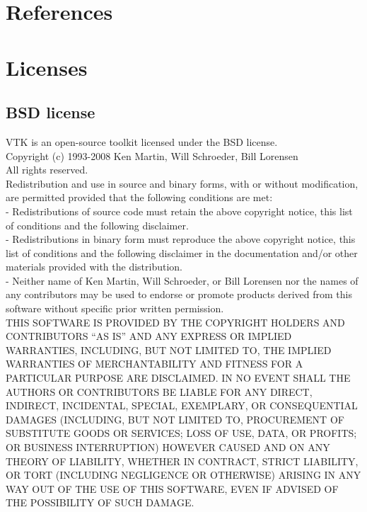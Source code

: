 \documentclass[a4paper,12pt,openany]{book}
\theoremstyle{break}
\begin{document}
\section{References}

\section{Licenses}
\subsection{BSD license}
VTK is an open-source toolkit licensed under the BSD license.\\
Copyright (c) 1993-2008 Ken Martin, Will Schroeder, Bill Lorensen \\
All rights reserved.\\
Redistribution and use in source and binary forms, with or without modification, are permitted provided that the following conditions are met: \\
- Redistributions of source code must retain the above copyright notice, this list of conditions and the following disclaimer. \\
- Redistributions in binary form must reproduce the above copyright notice, this list of conditions and the following disclaimer in the documentation and/or other materials provided with the distribution. \\
- Neither name of Ken Martin, Will Schroeder, or Bill Lorensen nor the names of any contributors may be used to endorse or promote products derived from this software without specific prior written permission.\\

THIS SOFTWARE IS PROVIDED BY THE COPYRIGHT HOLDERS AND CONTRIBUTORS “AS IS” AND ANY EXPRESS OR IMPLIED WARRANTIES, INCLUDING, BUT NOT LIMITED TO, THE IMPLIED WARRANTIES OF MERCHANTABILITY AND FITNESS FOR A PARTICULAR PURPOSE ARE DISCLAIMED. IN NO EVENT SHALL THE AUTHORS OR CONTRIBUTORS BE LIABLE FOR ANY DIRECT, INDIRECT, INCIDENTAL, SPECIAL, EXEMPLARY, OR CONSEQUENTIAL DAMAGES (INCLUDING, BUT NOT LIMITED TO, PROCUREMENT OF SUBSTITUTE GOODS OR SERVICES; LOSS OF USE, DATA, OR PROFITS; OR BUSINESS INTERRUPTION) HOWEVER CAUSED AND ON ANY THEORY OF LIABILITY, WHETHER IN CONTRACT, STRICT LIABILITY, OR TORT (INCLUDING NEGLIGENCE OR OTHERWISE) ARISING IN ANY WAY OUT OF THE USE OF THIS SOFTWARE, EVEN IF ADVISED OF THE POSSIBILITY OF SUCH DAMAGE.
\end{document}
